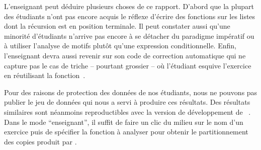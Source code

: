 L'enseignant peut déduire plusieurs choses de ce rapport. D'abord que
la plupart des étudiants n'ont pas encore acquis le réflexe d'écrire
des fonctions sur les listes dont la récursion est en position
terminale. Il peut constater aussi qu'une minorité d'étudiants
n'arrive pas encore à se détacher du paradigme impératif ou à utiliser
l'analyse de motifs plutôt qu'une expression conditionnelle. Enfin,
l'enseignant devra aussi revenir sur son code de correction automatique
qui ne capture pas le cas de triche -- pourtant grossier -- où l'étudiant
esquive l'exercice en réutilisant la fonction~.

Pour des raisons de protection des données de nos étudiants, nous ne
pouvons pas publier le jeu de données qui nous a servi à produire ces
résultats. Des résultats similaires sont néanmoins reproductibles avec
la version de développement de {\LearnOCaml}~\cite{learnocaml}. Dans le
mode ``enseignant'', il suffit de faire un clic du milieu sur le nom
d'un exercice puis de spécifier la fonction à analyser pour obtenir le
partitionnement des copies produit par {\Asak}.
